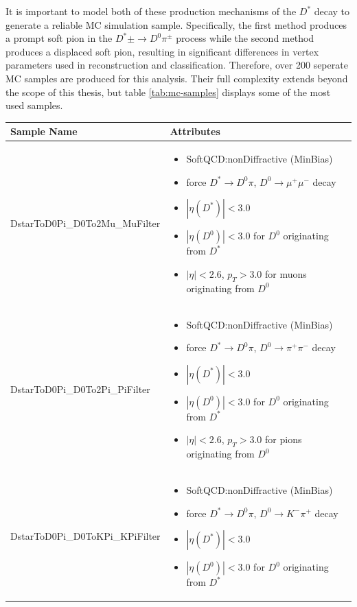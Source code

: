 It is important to model both of these production mechanisms of the $D^*$ decay to generate a reliable MC simulation sample. Specifically, the first method produces a prompt soft pion in the $D^*\pm \to D^0 \pi^\pm$ process while the second method produces a displaced soft pion, resulting in significant differences in vertex parameters used in reconstruction and classification. Therefore, over 200 seperate MC samples are produced for this analysis. Their full complexity extends beyond the scope of this thesis, but table \ref{tab:mc-samples} displays some of the most used samples.

\begin{tabularx}{\textwidth}{|l|X|}
    \hline
    \textbf{Sample Name} & \textbf{Attributes} \\
    \hline
    DstarToD0Pi\_D0To2Mu\_MuFilter &
    \begin{itemize}
      \item SoftQCD:nonDiffractive (MinBias)
      \item force $D^* \to D^0\pi$, $D^0 \to \mu^+\mu^-$ decay
      \item $|\eta(D^*)| < 3.0$
      \item $|\eta(D^0)| < 3.0$ for $D^0$ originating from $D^*$
      \item $|\eta| < 2.6$, $p_T > 3.0$ for muons originating from $D^0$
    \end{itemize} \\
    \hline
    DstarToD0Pi\_D0To2Pi\_PiFilter &
    \begin{itemize}
      \item SoftQCD:nonDiffractive (MinBias)
      \item force $D^* \to D^0\pi$, $D^0 \to \pi^+\pi^-$ decay
      \item $|\eta(D^*)| < 3.0$
      \item $|\eta(D^0)| < 3.0$ for $D^0$ originating from $D^*$
      \item $|\eta| < 2.6$, $p_T > 3.0$ for pions originating from $D^0$
    \end{itemize} \\
    \hline
    DstarToD0Pi\_D0ToKPi\_KPiFilter &
    \begin{itemize}
      \item SoftQCD:nonDiffractive (MinBias)
      \item force $D^* \to D^0\pi$, $D^0 \to K^-\pi^+$ decay
      \item $|\eta(D^*)| < 3.0$
      \item $|\eta(D^0)| < 3.0$ for $D^0$ originating from $D^*$

\end{itemize}
\end{tabularx}
